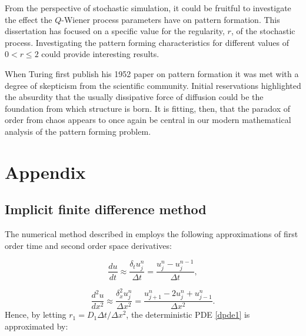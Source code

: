\documentclass[12pt]{article}
\begin{document}
From the perspective of stochastic simulation, it could be fruitful to investigate the effect the $Q$-Wiener process parameters have on pattern formation. This dissertation has focused on a specific value for the regularity, $r$, of the stochastic process. Investigating the pattern forming characteristics for different values of $0<r\leq 2$ could provide interesting results.


When Turing first publish his 1952 paper on pattern formation it was met with a degree of skepticism from the scientific community. Initial reservations highlighted the absurdity that the usually dissipative force of diffusion could be the foundation from which structure is born. It is fitting, then, that the paradox of order from chaos appears to once again be central in our modern mathematical analysis of the pattern forming problem. 
 
\printbibliography

\newpage
\appendix
\section{Appendix}
\subsection{Implicit finite difference method}
The numerical method described in  employs the following approximations of first order time and second order space derivatives:

\begin{equation*}
    \frac{du}{dt} \approx \frac{\delta_t u_j^n}{\Delta t} = \frac{u_j^{n} - u_j^{n-1}}{\Delta t},
\end{equation*}

\begin{equation*}
    \frac{d^2u}{dx^2} \approx \frac{\delta_x^2 u_j^n}{\Delta x^2} = \frac{u_{j+1}^n - 2u_j^n + u_{j-1}^n}{\Delta x^2}.
\end{equation*}
Hence, by letting $r_1 = D_1\Delta t / \Delta x^2$, the deterministic PDE \eqref{dpde1} is approximated by:
\end{document}
